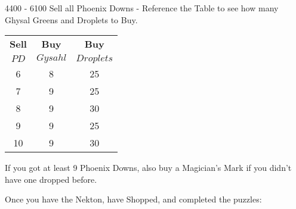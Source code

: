 \begin{shop}{4400 - 6100}
	Sell all Phoenix Downs - Reference the Table to see how many Ghysal Greens and Droplets to Buy.
	\begin{center}
		\begin{tabular}{c|c|c}
			\textbf{Sell} & \textbf{Buy} & \textbf{Buy} \\
			$PD$          & $Gysahl$     & $Droplets$   \\
			\hline
			6             & 8            & 25           \\
			7             & 9            & 25           \\
			8             & 9            & 30           \\
			9             & 9            & 25           \\
			10            & 9            & 30           \\
		\end{tabular}
	\end{center}

	If you got at least 9 Phoenix Downs, also buy a Magician's Mark if you didn't have one dropped before.
\end{shop}

Once you have the Nekton, have Shopped, and completed the puzzles:


